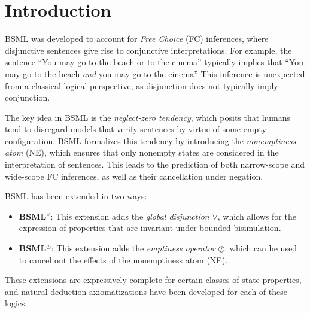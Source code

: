 
\section{Introduction}\label{sec:Introduction}

BSML was developed to account for \textit{Free Choice} (FC) inferences, where disjunctive sentences give rise to conjunctive interpretations. For example, the sentence ``You may go to the beach or to the cinema'' typically implies that ``You may go to the beach \textit{and} you may go to the cinema'' This inference is unexpected from a classical logical perspective, as disjunction does not typically imply conjunction.

The key idea in BSML is the \textit{neglect-zero tendency}, which posits that humans tend to disregard models that verify sentences by virtue of some empty configuration. BSML formalizes this tendency by introducing the \textit{nonemptiness atom} (NE), which ensures that only nonempty states are considered in the interpretation of sentences. This leads to the prediction of both narrow-scope and wide-scope FC inferences, as well as their cancellation under negation.

BSML has been extended in two ways:
\begin{itemize}
    \item \textbf{BSML\(^\vee\)}: This extension adds the \textit{global disjunction} \(\vee\), which allows for the expression of properties that are invariant under bounded bisimulation.
    \item \textbf{BSML\(^\oslash\)}: This extension adds the \textit{emptiness operator} \(\oslash\), which can be used to cancel out the effects of the nonemptiness atom (NE).
\end{itemize}

These extensions are expressively complete for certain classes of state properties, and natural deduction axiomatizations have been developed for each of these logics.